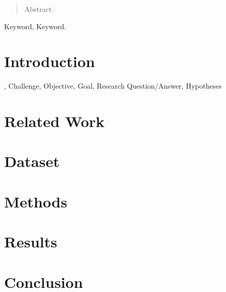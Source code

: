 \documentclass[lettersize,journal]{IEEEtran}
\begin{document}
\maketitle



\begin{abstract}
  Abstract.
\end{abstract}



\begin{IEEEkeywords}
Keyword, Keyword.
\end{IEEEkeywords}


\section{Introduction}
, Challenge, Objective, Goal, Research Question/Answer, Hypotheses


\section{Related Work}



\section[Methods]{Dataset}



\section[Methods]{Methods}

\section[Results]{Results}


\section{Conclusion}


\balance








\end{document}

